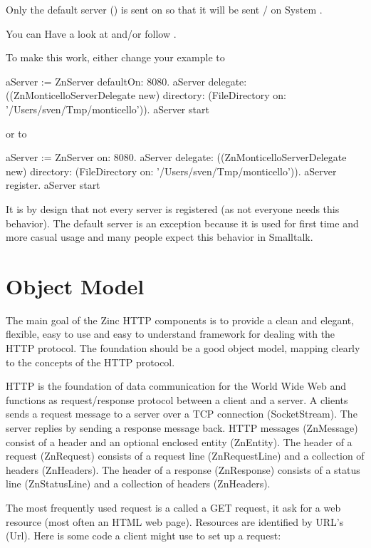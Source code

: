 \documentclass[a4paper,10pt,twoside]{book}
\begin{document}
  
Only the default server () is sent  on  so that it will be sent / on System .

You can Have a look at  and/or follow .

To make this work, either change your example to

\begin{code}{}
aServer := ZnServer defaultOn: 8080.
aServer delegate: ((ZnMonticelloServerDelegate new)
	directory: (FileDirectory on: '/Users/sven/Tmp/monticello')).
aServer start
\end{code}

or to 

\begin{code}{}
aServer := ZnServer on: 8080.
aServer delegate: ((ZnMonticelloServerDelegate new)
	directory: (FileDirectory on: '/Users/sven/Tmp/monticello')).
aServer register.
aServer start
\end{code}

It is by design that not every server is registered (as not everyone needs this behavior).
The default server is an exception because it is used for first time and more casual usage and many people expect this behavior in Smalltalk.
  

\section{Object Model}

The main goal of the Zinc HTTP components is to provide a clean and elegant, flexible, easy to use and easy to understand framework for dealing with the HTTP protocol. The foundation should be a good object model, mapping clearly to the concepts of the HTTP protocol.

HTTP is the foundation of data communication for the World Wide Web and functions as request/response protocol between a client and a server. A clients sends a request message to a server over a TCP connection (SocketStream). The server replies by sending a response message back. HTTP messages (ZnMessage) consist of a header and an optional enclosed entity (ZnEntity). The header of a request (ZnRequest) consists of a request line (ZnRequestLine) and a collection of headers (ZnHeaders). The header of a response (ZnResponse) consists of a status line (ZnStatusLine) and a collection of headers (ZnHeaders).

The most frequently used request is a called a GET request, it ask for a web resource (most often an HTML web page). Resources are identified by URL's (Url). Here is some code a client might use to set up a request:
\end{document}
